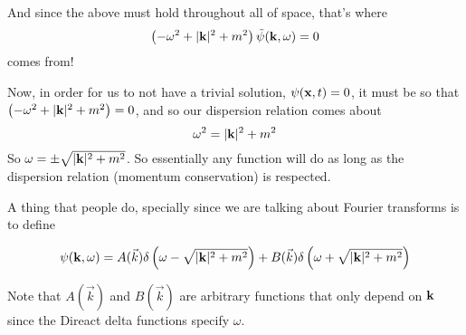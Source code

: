 And since the above must hold throughout all of space, that's where
$$
\left(-\omega^2 + |\boldsymbol{\mathbf{k}}|^2 + m^2 \right) \tilde{\psi}(\boldsymbol{\mathbf{k}}, \omega) = 0
$$
comes from!

Now, in order for us to not have a trivial solution, $\psi(\boldsymbol{\mathbf{x}}, t) = 0$, it must be so that
$\left(-\omega^2 + |\boldsymbol{\mathbf{k}}|^2 + m^2 \right) = 0$, and so our dispersion relation comes about
$$
\omega^2 = |\boldsymbol{\mathbf{k}}|^2 + m^2
$$
So $\omega = \pm \sqrt{ |\boldsymbol{\mathbf{k}}|^2 + m^2 }$.
So essentially any function will do as long as the dispersion relation (momentum conservation) is respected.

A thing that people do, specially since we are talking about Fourier transforms is to define

$$
\psi(\boldsymbol{\mathbf{k}}, \omega) = A(\vec{k}) \delta\left( \omega - \sqrt{ |\boldsymbol{\mathbf{k}}|^2 + m^2 }\right) +
    B(\vec{k}) \delta\left( \omega + \sqrt{ |\boldsymbol{\mathbf{k}}|^2 + m^2 }\right)
$$

Note that $A(\vec{k})$ and $B(\vec{k})$ are arbitrary functions that only depend on $\boldsymbol{\mathbf{k}}$ since the
Direact delta functions specify $\omega$.